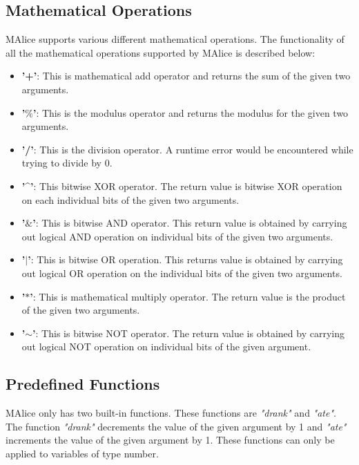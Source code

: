 \documentclass[a4wide, 11pt]{article}
\begin{document}
	\subsection{Mathematical Operations}
	\label{sec:mathOper}
		MAlice supports various different mathematical operations. The functionality of all the mathematical
		operations supported by MAlice is described below:
		\begin{itemize}
			\item {\bf '+'}: This is mathematical add operator and returns the sum of the given two arguments.
			\item {\bf '$\%$'}: This is the modulus operator and returns the modulus for the given two arguments.
			\item {\bf '/'}: This is the division operator. A runtime error would be encountered while trying to
				divide by 0.
			\item {\bf '\^{ }'}: This bitwise XOR operator. The return value is bitwise XOR operation on each
				individual bits of the given two arguments.
			\item {\bf '$\&$'}: This is bitwise AND operator. This return value is obtained by carrying out 
				logical AND operation on individual bits of the given two arguments.
			\item {\bf '$\mid$'}: This is bitwise OR operation. This returns value is obtained by carrying out 
				logical OR operation on the individual bits of the given two arguments.
			\item {\bf '$\ast$'}: This is mathematical multiply operator. The return value is the product of the
				given two arguments.
			\item {\bf '$\mathtt{\sim}$'}: This is bitwise NOT operator. The return value is obtained by carrying
				out logical NOT operation on individual bits of the given argument.
		\end{itemize}
 
	\subsection{Predefined Functions}
	\label{sec:preFunc}
		MAlice only has two built-in functions. These functions are \emph{"drank"} and \emph{"ate"}. The function
		\emph{"drank"} decrements the value of the given argument by 1 and \emph{"ate"} increments the value of the
		given argument by 1. These functions can only be applied to variables of type number.
\end{document}
